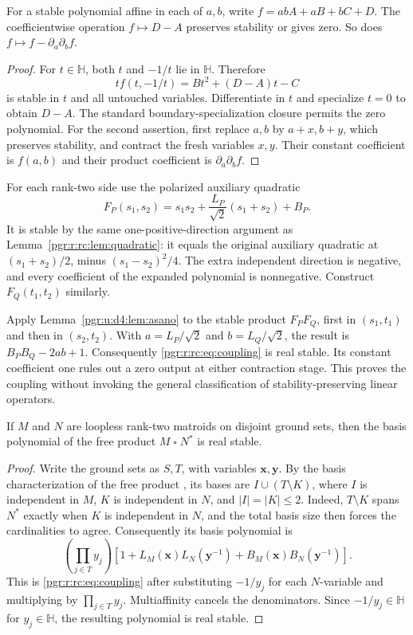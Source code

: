 \documentclass[11pt]{article}
\numberwithin{equation}{section}
\theoremstyle{definition}\newtheorem{definition}[theorem]{Definition}\newtheorem{remark}[theorem]{Remark}
\newcommand{\HH}{\mathbb H}                %
\begin{document}
\begin{lemma}\label{pgr:u:d4:lem:asano}
For a stable polynomial affine in each of $a,b$, write
$f=abA+aB+bC+D$. The coefficientwise operation $f\mapsto D-A$ preserves
stability or gives zero. So does $f\mapsto f-\partial_a\partial_bf$.
\end{lemma}
\begin{proof}
For $t\in\HH$, both $t$ and $-1/t$ lie in $\HH$. Therefore
\[
 t f(t,-1/t)=Bt^2+(D-A)t-C
\]
is stable in $t$ and all untouched variables. Differentiate in $t$ and
specialize $t=0$ to obtain $D-A$. The standard boundary-specialization
closure permits the zero polynomial. For the second assertion, first
replace $a,b$ by $a+x,b+y$, which preserves stability, and contract the
fresh variables $x,y$. Their constant coefficient is $f(a,b)$ and their
product coefficient is $\partial_a\partial_bf$.
\end{proof}

For each rank-two side use the polarized auxiliary quadratic
\[
 F_P(s_1,s_2)=s_1s_2+\frac{L_P}{\sqrt2}(s_1+s_2)+B_P.
\]
It is stable by the same one-positive-direction argument as
Lemma~\ref{pgr:r:rc:lem:quadratic}: it equals the original auxiliary
quadratic at $(s_1+s_2)/2$, minus $(s_1-s_2)^2/4$. The extra independent
direction is negative, and every coefficient of the expanded polynomial is
nonnegative. Construct $F_Q(t_1,t_2)$ similarly.

Apply Lemma~\ref{pgr:u:d4:lem:asano} to the stable product $F_PF_Q$, first
in $(s_1,t_1)$ and then in $(s_2,t_2)$. With $a=L_P/\sqrt2$ and
$b=L_Q/\sqrt2$, the result is $B_PB_Q-2ab+1$. Consequently
\eqref{pgr:r:rc:eq:coupling} is real stable. Its constant coefficient one
rules out a zero output at either contraction stage. This proves the
coupling without invoking the general classification of
stability-preserving linear operators.


\begin{corollary}\label{pgr:r:rc:cor:freeproduct}
If $M$ and $N$ are loopless rank-two matroids on disjoint ground sets, then the basis polynomial of the free product $M\mathbin{\square}N^*$ is real stable.
\end{corollary}
\begin{proof}
Write the ground sets as $S,T$, with variables $\mathbf x,\mathbf y$. By the basis characterization of the free product \cite[Proposition 1 and the following paragraph]{CS}, its bases are $I\cup(T\setminus K)$, where $I$ is independent in $M$, $K$ is independent in $N$, and $|I|=|K|\le2$. Indeed, $T\setminus K$ spans $N^*$ exactly when $K$ is independent in $N$, and the total basis size then forces the cardinalities to agree. Consequently its basis polynomial is
\[
 \left(\prod_{j\in T}y_j\right)
 \left[1+L_M(\mathbf x)L_N(\mathbf y^{-1})
          +B_M(\mathbf x)B_N(\mathbf y^{-1})\right].
\]
This is \eqref{pgr:r:rc:eq:coupling} after substituting $-1/y_j$ for each $N$-variable and multiplying by $\prod_{j\in T}y_j$. Multiaffinity cancels the denominators. Since $-1/y_j\in\HH$ for $y_j\in\HH$, the resulting polynomial is real stable.
\end{proof}
\end{document}

